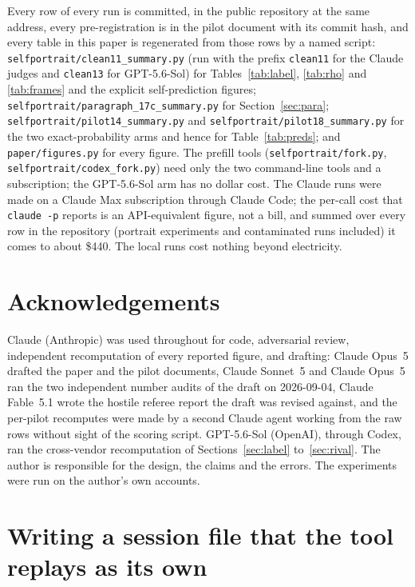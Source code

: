 \documentclass[twocolumn,10pt]{article}
\newcommand{\gpt}{GPT-5.6-Sol}
\begin{document}
Every row of every run is committed, in the public repository at the same address, every pre-registration is in the pilot document with its commit hash, and every table in this paper is regenerated from those rows by a named script: \texttt{selfportrait/clean11\_summary.py} (run with the prefix \texttt{clean11} for the Claude judges and \texttt{clean13} for \gpt{}) for Tables~\ref{tab:label}, \ref{tab:rho} and \ref{tab:frames} and the explicit self-prediction figures; \texttt{selfportrait/paragraph\_17c\_summary.py} for Section~\ref{sec:para}; \texttt{selfportrait/pilot14\_summary.py} and \texttt{selfportrait/pilot18\_summary.py} for the two exact-probability arms and hence for Table~\ref{tab:preds}; and \texttt{paper/figures.py} for every figure. The prefill tools (\texttt{selfportrait/fork.py}, \texttt{selfportrait/codex\_fork.py}) need only the two command-line tools and a subscription; the \gpt{} arm has no dollar cost. The Claude runs were made on a Claude Max subscription through Claude Code; the per-call cost that \texttt{claude -p} reports is an API-equivalent figure, not a bill, and summed over every row in the repository (portrait experiments and contaminated runs included) it comes to about \$440. The local runs cost nothing beyond electricity.

\section*{Acknowledgements}
Claude (Anthropic) was used throughout for code, adversarial review, independent recomputation of every reported figure, and drafting: Claude Opus~5 drafted the paper and the pilot documents, Claude Sonnet~5 and Claude Opus~5 ran the two independent number audits of the draft on 2026-09-04, Claude Fable~5.1 wrote the hostile referee report the draft was revised against, and the per-pilot recomputes were made by a second Claude agent working from the raw rows without sight of the scoring script. \gpt{} (OpenAI), through Codex, ran the cross-vendor recomputation of Sections~\ref{sec:label} to~\ref{sec:rival}. The author is responsible for the design, the claims and the errors. The experiments were run on the author's own accounts.




\appendix
\section{Writing a session file that the tool replays as its own}
\label{app:session}
\end{document}
